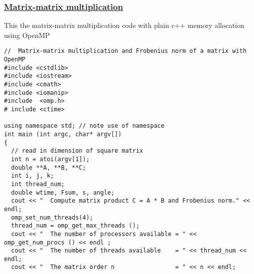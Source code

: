\documentclass{beamer}
\begin{document}
\begin{frame}
\frametitle{\href{{https://github.com/CompPhysics/ComputationalPhysicsMSU/blob/master/doc/Programs/ParallelizationOpenMP/OpenMPmatrixmatrixmult.cpp}}{Matrix-matrix multiplication}}

This the matrix-matrix multiplication code with plain c++ memory allocation using OpenMP
















































































\begin{verbatim}
//  Matrix-matrix multiplication and Frobenius norm of a matrix with OpenMP
#include <cstdlib>
#include <iostream>
#include <cmath>
#include <iomanip>
#include  <omp.h>
# include <ctime>

using namespace std; // note use of namespace
int main (int argc, char* argv[])
{
  // read in dimension of square matrix
  int n = atoi(argv[1]);
  double **A, **B, **C;
  int i, j, k;
  int thread_num;
  double wtime, Fsum, s, angle;
  cout << "  Compute matrix product C = A * B and Frobenius norm." << endl;
  omp_set_num_threads(4);
  thread_num = omp_get_max_threads ();
  cout << "  The number of processors available = " << omp_get_num_procs () << endl ;
  cout << "  The number of threads available    = " << thread_num <<  endl;
  cout << "  The matrix order n                 = " << n << endl;


\end{verbatim}
\end{frame}
\end{document}
